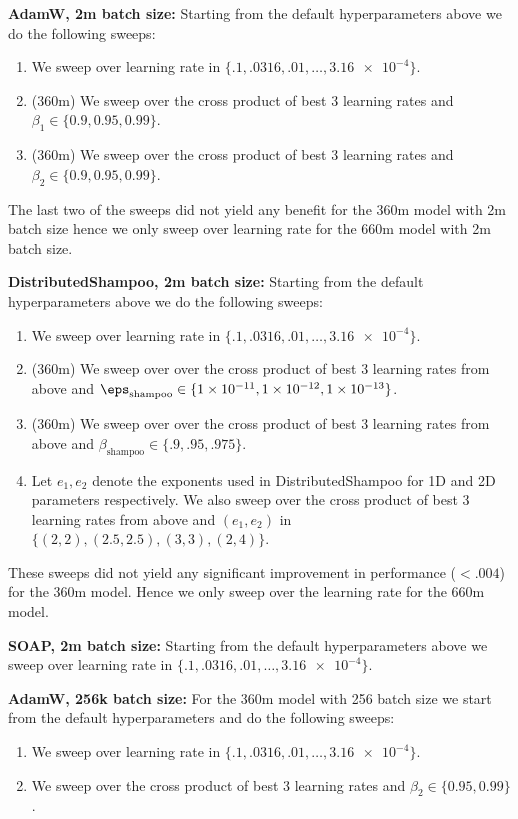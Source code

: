 \documentclass{article} %
\begin{document}
\textbf{AdamW, 2m batch size:} Starting from the default hyperparameters above we do the following sweeps:
\begin{enumerate}
    \item We sweep over learning rate in $\{.1, .0316, .01,\ldots, \num{3.16e-4}\}$.
    \item (360m) We sweep over the cross product of best 3 learning rates and $\beta_1 \in \{0.9, 0.95, 0.99\}$.
    \item (360m) We sweep over the cross product of best 3 learning rates and $\beta_2 \in \{0.9, 0.95, 0.99\}$.
\end{enumerate}

The last two of the sweeps did not yield any benefit for the 360m model with 2m batch size hence we only sweep over learning rate for the 660m model with 2m batch size. 


\textbf{DistributedShampoo, 2m batch size:} Starting from the default hyperparameters above we do the following sweeps:
\begin{enumerate}
    \item We sweep over learning rate in $\{.1, .0316, .01,\ldots, \num{3.16e-4}\}$.
    \item (360m) We sweep over over the cross product of best 3 learning rates from above and $\eps_{\text{shampoo}} \in \{\num{1e-11}, \num{1e-12}, \num{1e-13}\}$.
    \item (360m) We sweep over over the cross product of best 3 learning rates from above and $\beta_{\text{shampoo}} \in \{.9, .95, .975\}$.
    \item Let $e_1, e_2$ denote the exponents used in DistributedShampoo for 1D and 2D parameters respectively. We also sweep over the cross product of best 3 learning rates from above and $(e_1, e_2)$ in $\{(2, 2), (2.5, 2.5), (3, 3), (2, 4)\}$.
\end{enumerate}

These sweeps did not yield any significant improvement in performance ($<.004$) for the 360m model. Hence we only sweep over the learning rate for the 660m model.

\textbf{SOAP, 2m batch size:} Starting from the default hyperparameters above we sweep over learning rate in $\{.1, .0316, .01,\ldots, \num{3.16e-4}\}$.

\textbf{AdamW, 256k batch size:}
For the 360m model with 256 batch size we start from the default hyperparameters and do the following sweeps:
\begin{enumerate}
    \item We sweep over learning rate in $\{.1, .0316, .01,\ldots, \num{3.16e-4}\}$.
    \item We sweep over the cross product of best 3 learning rates and $\beta_2 \in \{0.95,0.99\}$.
\end{enumerate}
\end{document}
